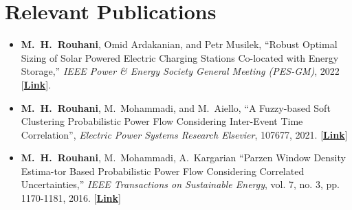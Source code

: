 \documentclass[11pt,a4paper,sans]{moderncv} %
\begin{document}
	\section{Relevant Publications}
	\begin{itemize}
		\item \textbf{M.~H.~Rouhani}, Omid Ardakanian, and Petr Musilek, ``Robust Optimal Sizing of Solar Powered Electric Charging Stations Co-located with Energy Storage,'' \textit{IEEE Power \&  Energy Society General Meeting (PES-GM)}, 2022 [\href{http://webdocs.cs.ualberta.ca/~oardakan/files/PESGM22.pdf}{\textbf{Link}}].
		
		
		\item \textbf{M.~H.~Rouhani}, M.~Mohammadi, and M.~Aiello, ``A Fuzzy-based Soft Clustering Probabilistic Power Flow Considering Inter-Event Time Correlation'', \textit{Electric Power Systems Research Elsevier}, 107677,  2021. [\href{https://www.sciencedirect.com/science/article/pii/S0378779621006581}{\textbf{Link}}]
		
		
		\item  \textbf{M.~H.~Rouhani}, M.~Mohammadi, A.~Kargarian ``Parzen Window Density Estima-tor Based Probabilistic Power Flow Considering Correlated Uncertainties,'' \textit{IEEE Transactions on Sustainable Energy}, vol. 7, no. 3, pp. 1170-1181, 2016. [\href{https://ieeexplore.ieee.org/abstract/document/7434076}{\textbf{Link}}]
		
	\end{itemize}
	
\end{document}
